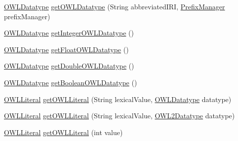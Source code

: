 \begin{DoxyCompactItemize}
\item 
\hyperlink{interfaceorg_1_1semanticweb_1_1owlapi_1_1model_1_1_o_w_l_datatype}{O\-W\-L\-Datatype} \hyperlink{interfaceorg_1_1semanticweb_1_1owlapi_1_1model_1_1_o_w_l_data_factory_a7be1821ba6dcfb2641191938e0006a8d}{get\-O\-W\-L\-Datatype} (String abbreviated\-I\-R\-I, \hyperlink{interfaceorg_1_1semanticweb_1_1owlapi_1_1model_1_1_prefix_manager}{Prefix\-Manager} prefix\-Manager)
\item 
\hyperlink{interfaceorg_1_1semanticweb_1_1owlapi_1_1model_1_1_o_w_l_datatype}{O\-W\-L\-Datatype} \hyperlink{interfaceorg_1_1semanticweb_1_1owlapi_1_1model_1_1_o_w_l_data_factory_ad9a2be03355eb7d6ee6f8a43ae317118}{get\-Integer\-O\-W\-L\-Datatype} ()
\item 
\hyperlink{interfaceorg_1_1semanticweb_1_1owlapi_1_1model_1_1_o_w_l_datatype}{O\-W\-L\-Datatype} \hyperlink{interfaceorg_1_1semanticweb_1_1owlapi_1_1model_1_1_o_w_l_data_factory_ae980f70199794a2b1ffa5e92c89b9f85}{get\-Float\-O\-W\-L\-Datatype} ()
\item 
\hyperlink{interfaceorg_1_1semanticweb_1_1owlapi_1_1model_1_1_o_w_l_datatype}{O\-W\-L\-Datatype} \hyperlink{interfaceorg_1_1semanticweb_1_1owlapi_1_1model_1_1_o_w_l_data_factory_a701df13f5e01c265e498dc76073ab89e}{get\-Double\-O\-W\-L\-Datatype} ()
\item 
\hyperlink{interfaceorg_1_1semanticweb_1_1owlapi_1_1model_1_1_o_w_l_datatype}{O\-W\-L\-Datatype} \hyperlink{interfaceorg_1_1semanticweb_1_1owlapi_1_1model_1_1_o_w_l_data_factory_aa9641c1fb69f140cc27fe88a24c6ccff}{get\-Boolean\-O\-W\-L\-Datatype} ()
\item 
\hyperlink{interfaceorg_1_1semanticweb_1_1owlapi_1_1model_1_1_o_w_l_literal}{O\-W\-L\-Literal} \hyperlink{interfaceorg_1_1semanticweb_1_1owlapi_1_1model_1_1_o_w_l_data_factory_aac63a679abbc688edb8a25bc194e4312}{get\-O\-W\-L\-Literal} (String lexical\-Value, \hyperlink{interfaceorg_1_1semanticweb_1_1owlapi_1_1model_1_1_o_w_l_datatype}{O\-W\-L\-Datatype} datatype)
\item 
\hyperlink{interfaceorg_1_1semanticweb_1_1owlapi_1_1model_1_1_o_w_l_literal}{O\-W\-L\-Literal} \hyperlink{interfaceorg_1_1semanticweb_1_1owlapi_1_1model_1_1_o_w_l_data_factory_ab0a191f9a3ec13e07e7e031e62413e5c}{get\-O\-W\-L\-Literal} (String lexical\-Value, \hyperlink{enumorg_1_1semanticweb_1_1owlapi_1_1vocab_1_1_o_w_l2_datatype}{O\-W\-L2\-Datatype} datatype)
\item 
\hyperlink{interfaceorg_1_1semanticweb_1_1owlapi_1_1model_1_1_o_w_l_literal}{O\-W\-L\-Literal} \hyperlink{interfaceorg_1_1semanticweb_1_1owlapi_1_1model_1_1_o_w_l_data_factory_aa57bdc1d2d1503f536ad510dab9f5097}{get\-O\-W\-L\-Literal} (int value)

\end{DoxyCompactItemize}
